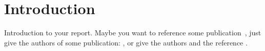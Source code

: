 \section{Introduction} \label{introduction}

Introduction to your report. Maybe you want to reference some publication~\cite{Bergsma:2007}, just give the authors of some publication: \citeauthor{Bergsma:2007}, or give the authors and the reference \citet{Bergsma:2007}. \citet{Risvik:2003}
